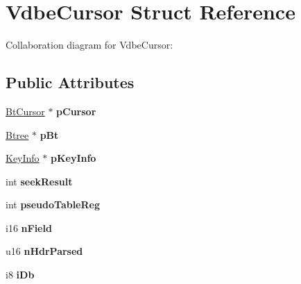 \hypertarget{struct_vdbe_cursor}{\section{Vdbe\+Cursor Struct Reference}
\label{struct_vdbe_cursor}
}


Collaboration diagram for Vdbe\+Cursor\+:
\subsection*{Public Attributes}
\begin{DoxyCompactItemize}
\item 
\hypertarget{struct_vdbe_cursor_a9ecb4ab9f7374f92da69f03fc336c293}{\hyperlink{struct_bt_cursor}{Bt\+Cursor} $\ast$ {\bfseries p\+Cursor}}\label{struct_vdbe_cursor_a9ecb4ab9f7374f92da69f03fc336c293}

\item 
\hypertarget{struct_vdbe_cursor_a287db3fe6d84102fad3d69494b565e9b}{\hyperlink{struct_btree}{Btree} $\ast$ {\bfseries p\+Bt}}\label{struct_vdbe_cursor_a287db3fe6d84102fad3d69494b565e9b}

\item 
\hypertarget{struct_vdbe_cursor_a72a6c26ab2ab2ad699dfb45703ea4765}{\hyperlink{struct_key_info}{Key\+Info} $\ast$ {\bfseries p\+Key\+Info}}\label{struct_vdbe_cursor_a72a6c26ab2ab2ad699dfb45703ea4765}

\item 
\hypertarget{struct_vdbe_cursor_a5eff86e2a9c87dc15956ad362aa03f05}{int {\bfseries seek\+Result}}\label{struct_vdbe_cursor_a5eff86e2a9c87dc15956ad362aa03f05}

\item 
\hypertarget{struct_vdbe_cursor_a8618d7c5669c83856e95b8ef72ef67b7}{int {\bfseries pseudo\+Table\+Reg}}\label{struct_vdbe_cursor_a8618d7c5669c83856e95b8ef72ef67b7}

\item 
\hypertarget{struct_vdbe_cursor_a2c903d08588ce7ade6ca4f678bd83bbb}{i16 {\bfseries n\+Field}}\label{struct_vdbe_cursor_a2c903d08588ce7ade6ca4f678bd83bbb}

\item 
\hypertarget{struct_vdbe_cursor_a3e0ed59c6fd714032e665a6249087924}{u16 {\bfseries n\+Hdr\+Parsed}}\label{struct_vdbe_cursor_a3e0ed59c6fd714032e665a6249087924}

\item 
\hypertarget{struct_vdbe_cursor_ace3e5ef31acdc9bca7b080da2af493a1}{i8 {\bfseries i\+Db}}\label{struct_vdbe_cursor_ace3e5ef31acdc9bca7b080da2af493a1}


\end{DoxyCompactItemize}
